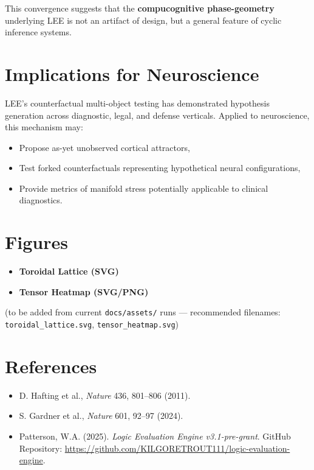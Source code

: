 \documentclass[11pt]{article}
\begin{document}
	This convergence suggests that the \textbf{compucognitive phase-geometry} underlying LEE is not an artifact of design, but a general feature of cyclic inference systems.
	
	\section{Implications for Neuroscience}
	LEE’s counterfactual multi-object testing has demonstrated hypothesis generation across diagnostic, legal, and defense verticals. Applied to neuroscience, this mechanism may:
	\begin{itemize}
		\item Propose as-yet unobserved cortical attractors,
		\item Test forked counterfactuals representing hypothetical neural configurations,
		\item Provide metrics of manifold stress potentially applicable to clinical diagnostics.
	\end{itemize}
	
	\section{Figures}
	\begin{itemize}
		\item \textbf{Toroidal Lattice (SVG)}
		\item \textbf{Tensor Heatmap (SVG/PNG)}
	\end{itemize}
	(to be added from current \texttt{docs/assets/} runs — recommended filenames: \texttt{toroidal\_lattice.svg}, \texttt{tensor\_heatmap.svg})
	
	\section{References}
	\begin{itemize}
		\item D. Hafting et al., \textit{Nature} 436, 801–806 (2011).
		\item S. Gardner et al., \textit{Nature} 601, 92–97 (2024).
		\item Patterson, W.A. (2025). \textit{Logic Evaluation Engine v3.1-pre-grant}. GitHub Repository: \href{https://github.com/KILGORETROUT111/logic-evaluation-engine}{https://github.com/KILGORETROUT111/logic-evaluation-engine}.
	\end{itemize}
	
\end{document}
